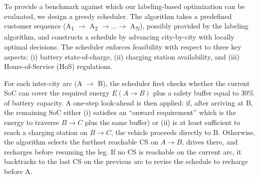 \documentclass[3p,11pt,authoryear]{elsarticle}  %
\begin{document}
To provide a benchmark against which our labeling-based optimization can be evaluated, we design a greedy scheduler. The algorithm takes a predefined customer sequence (A\textsubscript{1} $\rightarrow$ A\textsubscript{2} $\rightarrow \dots \rightarrow$ A\textsubscript{N}), possibly provided by the labeling algorithm, and constructs a schedule by advancing city-by-city with locally optimal decisions. The scheduler enforces feasibility with respect to three key aspects: (i) battery state-of-charge, (ii) charging station availability, and (iii) Hours-of-Service (HoS) regulations.


For each inter-city arc (A $\rightarrow$ B), the scheduler first checks whether the current SoC can cover the required energy $E(A\!\rightarrow\!B)$ plus a safety buffer equal to $30\%$ of battery capacity. A one-step look-ahead is then applied: if, after arriving at B, the remaining SoC either (i) satisfies an “onward requirement” which is the energy to traverse $B\!\rightarrow\!C$ plus the same buffer) or (ii) is at least sufficient to reach a charging station on $B\!\rightarrow\!C$, the vehicle proceeds directly to B. Otherwise, the algorithm selects the furthest reachable CS on $A\!\rightarrow\!B$, drives there, and recharges before resuming the leg. If no CS is reachable on the current arc, it backtracks to the last CS on the previous arc to revise the schedule to recharge before A.
\end{document}
